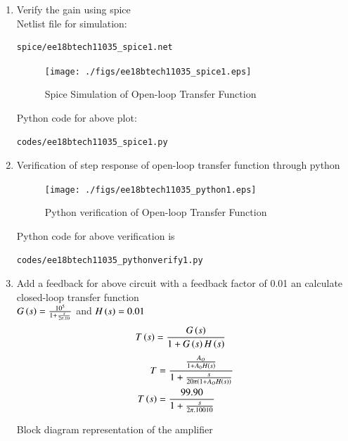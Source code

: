 \begin{enumerate}[label=\thesubsection.\arabic*.,ref=\thesubsection.\theenumi]
\item Verify the gain using spice\\
\solution Netlist file for simulation:
\begin{lstlisting}
spice/ee18btech11035_spice1.net
\end{lstlisting}

\begin{figure}[!h]
  \texttt{[image: ./figs/ee18btech11035\_spice1.eps]}
  \caption{Spice Simulation of Open-loop Transfer Function}
  \label{fig:ee18btech11035_spice1}
\end{figure}


Python code for above plot:
\begin{lstlisting}
codes/ee18btech11035_spice1.py
\end{lstlisting}

\item Verification of step response of open-loop transfer function through python\\
\solution 
\begin{figure}[!h]
  \texttt{[image: ./figs/ee18btech11035\_python1.eps]}
  \caption{Python verification of Open-loop Transfer Function}
  \label{fig:ee18btech11035_pv1}
\end{figure}

Python code for above verification is 
\begin{lstlisting}
codes/ee18btech11035_pythonverify1.py
\end{lstlisting}


\item Add a feedback for above circuit with a feedback factor of 0.01 an calculate closed-loop transfer function\\
\solution $G\left(s\right)=\frac{10^5}{1+\frac{s}{2\pi.10}}$ and $H\left(s\right)=0.01$
\begin{align}
    T\left(s\right)&=\frac{G\left(s\right)}{1+G\left(s\right)H\left(s\right)}
\end{align}
\begin{align}
    T&=\frac{\frac{A_{O}}{1+A_{0}H\left(s\right)}}{1+\frac{s}{20\pi\left(1+A_{O}H\left(s\right)\right)}}\\
    T\left(s\right)&=\frac{99.90}{1+\frac{s}{2\pi.10010}}
\end{align}





Block diagram representation of the amplifier
\begin{figure}[!ht]
    \begin{center}
		\resizebox{\columnwidth}{!}{}
	\end{center}
\caption{}
\label{fig:ee18btech11035_block}
\end{figure}


\end{enumerate}

